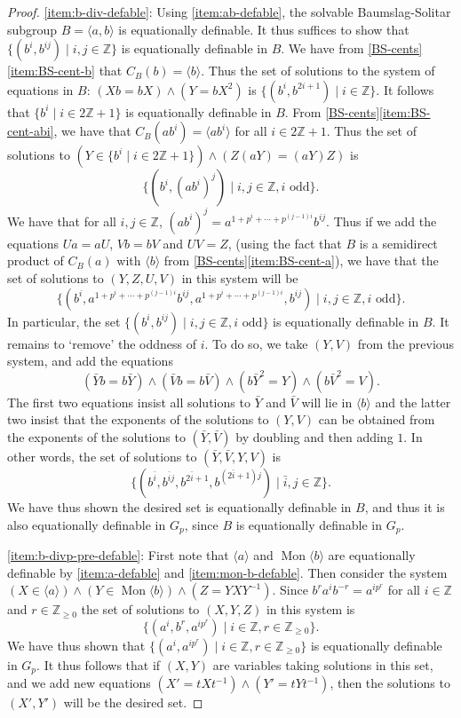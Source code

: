 \documentclass[11pt]{amsart}
\theoremstyle{definition}
\numberwithin{theorem}{section}
\DeclareMathOperator{\Mon}{Mon}
\newcommand{\Z}{\mathbb{Z}}
\begin{document}
\begin{proof}
	\eqref{item:b-div-defable}: Using \eqref{item:ab-defable}, the solvable
	Baumslag-Solitar subgroup \(B = \langle a, b \rangle\) is equationally
	definable. It thus suffices to show that \(\{(b^i, b^{ij}) \mid i, j \in
	\Z\}\) is equationally definable in \(B\). We have from \cref{BS-cents}
	\eqref{item:BS-cent-b} that \(C_B(b) = \langle b \rangle\). Thus the
	set of solutions to the system of equations in \(B\): \((Xb = bX) \wedge (Y = bX^2)\) is
	\(\{(b^i, b^{2i + 1}) \mid i \in \Z\}\). It follows that
	\(\{b^i \mid i \in 2 \Z + 1\}\) is equationally definable in \(B\). From
	\cref{BS-cents}\eqref{item:BS-cent-abi}, we have that \(C_B(ab^i) = \langle ab^i
	\rangle\) for all \(i \in 2 \Z + 1\). Thus the set of solutions to
	\((Y \in \{b^i \mid i \in 2\Z + 1\}) \wedge (Z (aY) = (aY)Z)\) is
	\[
		\{(b^i, (ab^i)^j) \mid i, j \in \Z, i \text{ odd}\}.
	\]
	We have that for all \(i, j \in \Z\), \((ab^i)^j = a^{1 + p^i + \cdots +
	p^{(j - 1)i}} b^{ij}\). Thus if we add the equations \(Ua = aU\), \(Vb =
	bV\) and \(UV = Z\), (using the fact that \(B\) is a semidirect product of
	\(C_B(a)\) with \(\langle b \rangle\) from
	\cref{BS-cents}\eqref{item:BS-cent-a}), we have that the set of solutions
	to \((Y, Z, U, V)\) in this system will be
	\[
			\{(b^i, a^{1 + p^i + \cdots + p^{(j - 1)i}} b^{ij},  a^{1 + p^i +
			\cdots + p^{(j - 1)i}}, b^{ij}) \mid i, j \in \Z, i \text{ odd}\}.
	\]
	In particular, the set \(\{(b^i, b^{ij}) \mid i, j \in \Z, i \text{ odd}\}\)
	is equationally definable in \(B\). It remains to `remove' the oddness
	of \(i\). To do so, we take \((Y, V)\) from the previous system, and add
	the equations
	\[
		(\bar{Y} b = b \bar{Y}) \wedge
		(\bar{V} b = b \bar{V}) \wedge
		(b \bar{Y}^2 = Y) \wedge
		(b \bar{V}^2 = V).
	\]
	The first two equations insist all solutions to \(\bar{Y}\) and \(\bar{V}\)
	will lie in \(\langle b \rangle\) and the latter two insist that the exponents of
	the solutions to \((Y, V)\) can be obtained from the exponents of the solutions
	to \((\bar{Y}, \bar{V})\) by doubling and then adding \(1\). In other words,
	the set of solutions to \((\bar{Y}, \bar{V}, Y, V)\) is
	\[
			\{(b^{\bar{i}}, b^{\bar{i} j}, b^{2 \bar{i} + 1},
			b^{(2 \bar i + 1)j}) \mid \bar{i}, j \in \Z\}.
	\]
	We have thus shown the desired set is equationally definable in \(B\), and thus it
	is also equationally definable in \(G_p\), since \(B\) is equationally definable
	in \(G_p\).

	\eqref{item:b-divp-pre-defable}: First note that \(\langle a \rangle\) and
	\(\Mon\langle b \rangle\) are equationally definable by \eqref{item:a-defable}
	and \eqref{item:mon-b-defable}. Then consider the system \((X \in \langle a
	\rangle) \wedge (Y \in \Mon\langle b \rangle) \wedge (Z = YXY^{-1}) \). Since
	\(b^r a^i b^{-r} = a^{ip^r}\) for all \(i \in \Z\) and \(r \in \Z_{\geq 0}\) 
	the set of solutions to \((X, Y, Z)\) in this system is
	\[
			\{(a^i, b^r, a^{ip^r}) \mid i \in \Z, r \in \Z_{\geq 0}\}.
	\]
	We have thus shown that \(\{(a^i, a^{ip^r}) \mid i \in \Z, r \in \Z_{\geq 0}\}\)
	is equationally definable in \(G_p\). It thus follows that if
	\((X, Y)\) are variables taking solutions in this set, and we add new
	equations \((X' = tXt^{-1}) \wedge (Y' = t Y t^{-1})\), then the
	solutions to \((X', Y')\) will be the desired set.


\end{proof}
\end{document}
